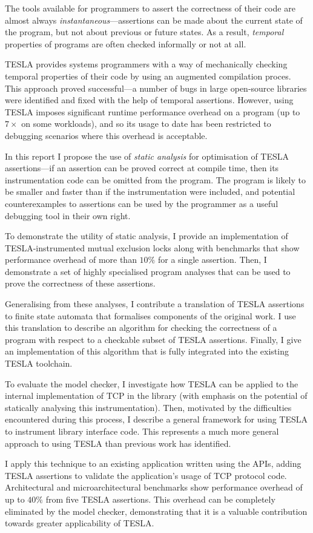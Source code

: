 The tools available for programmers to assert the correctness of their code are
almost always \emph{instantaneous}---assertions can be made about the current
state of the program, but not about previous or future states. As a result,
\emph{temporal} properties of programs are often checked informally or not at
all.

TESLA \cite{anderson_tesla:_2014} provides systems programmers with a way of
mechanically checking temporal properties of their code by using an augmented
compilation proces. This approach proved successful---a number of bugs in large
open-source libraries were identified and fixed with the help of temporal
assertions. However, using TESLA imposes significant runtime performance
overhead on a program (up to $7\times$ on some workloads), and so its usage to
date has been restricted to debugging scenarios where this overhead is
acceptable.

In this report I propose the use of \emph{static analysis} for optimisation of
TESLA assertions---if an assertion can be proved correct at compile time, then
its instrumentation code can be omitted from the program. The program is likely
to be smaller and faster than if the instrumentation were included, and
potential counterexamples to assertions can be used by the programmer as a
useful debugging tool in their own right.

To demonstrate the utility of static analysis, I provide an implementation of
TESLA-instrumented mutual exclusion locks along with benchmarks that show
performance overhead of more than $10\%$ for a single assertion. Then, I
demonstrate a set of highly specialised program analyses that can be used to
prove the correctness of these assertions.

Generalising from these analyses, I contribute a translation of TESLA assertions
to finite state automata that formalises components of the original work. I use
this translation to describe an algorithm for checking the correctness of a
program with respect to a checkable subset of TESLA assertions. Finally, I give
an implementation of this algorithm that is fully integrated into the existing
TESLA toolchain.

To evaluate the model checker, I investigate how TESLA can be applied to the
internal implementation of TCP in the \lwip{} library \cite{dunkels_design_2001}
(with emphasis on the potential of statically analysing this instrumentation).
Then, motivated by the difficulties encountered during this process, I describe
a general framework for using TESLA to instrument library interface code. This
represents a much more general approach to using TESLA than previous work has
identified.

I apply this technique to an existing application written using the \lwip{}
APIs, adding TESLA assertions to validate the application's usage of TCP
protocol code. Architectural and microarchitectural benchmarks show performance
overhead of up to $40\%$ from five TESLA assertions. This overhead can be
completely eliminated by the model checker, demonstrating that it is a valuable
contribution towards greater applicability of TESLA.
